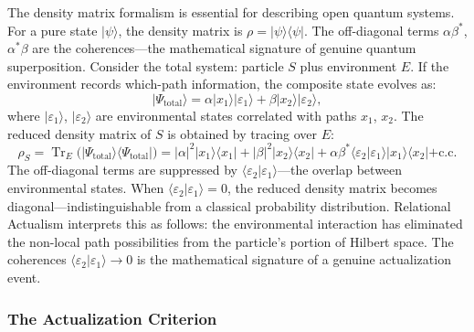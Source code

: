 \documentclass[11pt,a4paper]{article}
\theoremstyle{plain}
\theoremstyle{definition}
\theoremstyle{remark}
\newcommand{\ket}[1]{|#1\rangle}
\newcommand{\bra}[1]{\langle #1|}
\newcommand{\braket}[2]{\langle #1 | #2 \rangle}
\newcommand{\rhoS}{\rho_{S}}
\begin{document}
The density matrix formalism is essential for describing open quantum systems. For
a pure state $\ket{\psi}$, the density matrix is $\rho = \ket{\psi}\!\bra{\psi}$.
The off-diagonal terms $\alpha\beta^{*}$, $\alpha^{*}\beta$ are the
coherences---the mathematical signature of genuine quantum superposition. Consider
the total system: particle $S$ plus environment $E$. If the environment records
which-path information, the composite state evolves as:
\begin{equation}
  \ket{\Psi_{\mathrm{total}}} = \alpha\ket{x_1}\ket{\varepsilon_1}
  + \beta\ket{x_2}\ket{\varepsilon_2},
\end{equation}
where $\ket{\varepsilon_1}$, $\ket{\varepsilon_2}$ are environmental states
correlated with paths $x_1$, $x_2$. The reduced density matrix of $S$ is obtained
by tracing over $E$:
\begin{equation}
  \rhoS = \operatorname{Tr}_{E}\!\bigl(\ket{\Psi_{\mathrm{total}}}\!
           \bra{\Psi_{\mathrm{total}}}\bigr)
  = |\alpha|^2\ket{x_1}\!\bra{x_1}
  + |\beta|^2\ket{x_2}\!\bra{x_2}
  + \alpha\beta^{*}\braket{\varepsilon_2}{\varepsilon_1}\ket{x_1}\!\bra{x_2}
  + \mathrm{c.c.}
\end{equation}
The off-diagonal terms are suppressed by $\braket{\varepsilon_2}{\varepsilon_1}$---the
overlap between environmental states. When $\braket{\varepsilon_2}{\varepsilon_1}
= 0$, the reduced density matrix becomes diagonal---indistinguishable from a
classical probability distribution. Relational Actualism interprets this as
follows: the environmental interaction has eliminated the non-local path
possibilities from the particle's portion of Hilbert space. The coherences
$\braket{\varepsilon_2}{\varepsilon_1} \to 0$ is the mathematical signature of a
genuine actualization event.

\subsubsection{The Actualization Criterion}
\label{sec:criterion}
\end{document}
